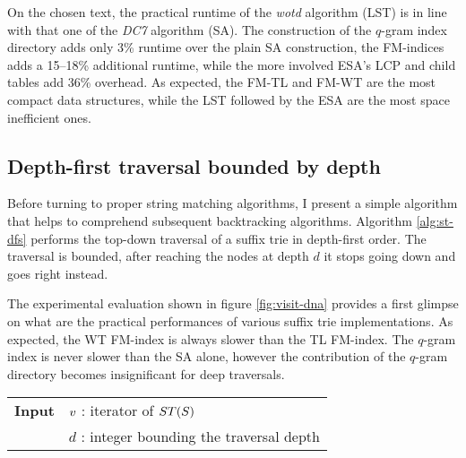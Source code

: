 On the chosen text, the practical runtime of the \emph{wotd} algorithm (LST) is in line with that one of the \emph{DC7} algorithm (SA). The construction of the $q$-gram index directory adds only 3\% runtime over the plain SA construction, the FM-indices adds a 15--18\% additional runtime, while the more involved ESA's LCP and child tables add 36\% overhead.
As expected, the FM-TL and FM-WT are the most compact data structures, while the LST followed by the ESA are the most space inefficient ones.

\begin{table}[t]
\begin{center}
\caption[Index construction times and memory footprints]{Index construction times and memory footprints.}
\sffamily

\label{tab:index:construction}
\end{center}
\end{table}

\subsection{Depth-first traversal bounded by depth}
\label{sec:index:algo:traversal}

Before turning to proper string matching algorithms, I present a simple algorithm that helps to comprehend subsequent backtracking algorithms.
Algorithm \ref{alg:st-dfs} performs the top-down traversal of a suffix trie in depth-first order.
The traversal is bounded, \ie after reaching the nodes at depth $d$ it stops going down and goes right instead.

The experimental evaluation shown in figure \ref{fig:visit-dna} provides a first glimpse on what are the practical performances of various suffix trie implementations.
As expected, the WT FM-index is always slower than the TL FM-index.
The $q$-gram index is never slower than the SA alone, however the contribution of the $q$-gram directory becomes insignificant for deep traversals.

\begin{figure*}[b]
\begin{center}
\begin{minipage}[t]{.7\textwidth}
\begin{algorithm}[H]
\begin{tabular}{ll}
\textbf{Input}  & $v$ : iterator of $ST(S)$\\
 			    & $d$ : integer bounding the traversal depth\\
\end{tabular}
\begin{algorithmic}[1]
		\Repeat
			\State {}
		\Until {}
	\EndIf
\EndIf
\end{algorithmic}
\label{alg:st-dfs}
\end{algorithm}
\end{minipage}
\end{center}
\end{figure*}

